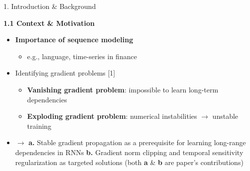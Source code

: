 \documentclass[final]{beamer}
\begin{document}
\begin{frame}[t]
  
  \begin{columns}[t,totalwidth=\textwidth]

    \hspace{0.05cm}
    \begin{column}{0.3\textwidth}
      \begin{block}{1. Introduction \& Background}

        \textbf{1.1 Context \& Motivation}
            \begin{itemize}
            \item \textbf{Importance of sequence modeling}
            \begin{itemize}
                \item e.g., language, time-series in finance
            \end{itemize}

            \item Identifying gradient problems [1]%
            \begin{itemize}
                \item \textbf{Vanishing gradient problem}: impossible to learn long-term dependencies
                \item \textbf{Exploding gradient problem}: numerical instabilities $\rightarrow$ unstable training
            \end{itemize}

            \item $\rightarrow$ \textbf{a.} Stable gradient propagation as a prerequisite for learning long-range dependencies in RNNs
\textbf{b.} Gradient norm clipping and temporal sensitivity regularization as targeted solutions (both \textbf{a} \& \textbf{b} are paper's contributions)
            \end{itemize}


\end{block}
\end{column}
\end{columns}
\end{frame}
\end{document}
